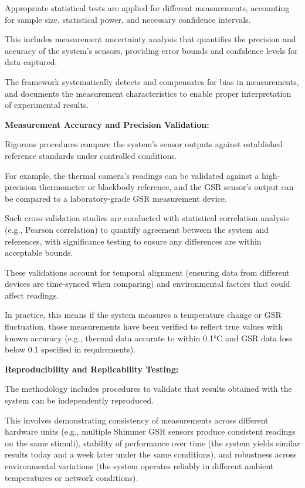 Appropriate statistical tests are applied for different measurements, accounting for
sample size, statistical power, and necessary confidence intervals.

This includes measurement uncertainty analysis that quantifies the precision and
accuracy of the system's sensors, providing error bounds and confidence levels for
data captured.

The framework systematically detects and compensates for bias in measurements, and
documents the measurement characteristics to enable proper interpretation of
experimental results.

\textbf{Measurement Accuracy and Precision Validation:}

Rigorous procedures compare the system's sensor outputs against established reference
standards under controlled conditions.

For example, the thermal camera's readings can be validated against a high-precision
thermometer or blackbody reference, and the GSR sensor's output can be compared to a
laboratory-grade GSR measurement device.

Such cross-validation studies are conducted with statistical correlation analysis
(e.g., Pearson correlation) to quantify agreement between the system and references,
with significance testing to ensure any differences are within acceptable bounds.

These validations account for temporal alignment (ensuring data from different
devices are time-synced when comparing) and environmental factors that could affect
readings.

In practice, this means if the system measures a temperature change or GSR
fluctuation, those measurements have been verified to reflect true values with known
accuracy (e.g., thermal data accurate to within 0.1°C and GSR data loss below 0.1%
specified in requirements).

\textbf{Reproducibility and Replicability Testing:}

The methodology includes procedures to validate that results obtained with the system
can be independently reproduced.

This involves demonstrating consistency of measurements across different hardware
units (e.g., multiple Shimmer GSR sensors produce consistent readings on the same
stimuli), stability of performance over time (the system yields similar results today
and a week later under the same conditions), and robustness across environmental
variations (the system operates reliably in different ambient temperatures or network
conditions).

